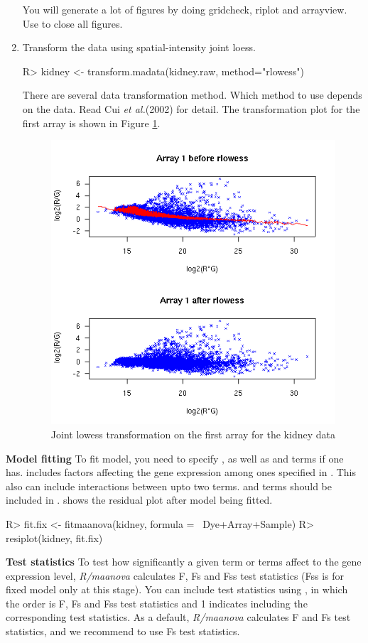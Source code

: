 \begin{enumerate}
You will generate a lot of figures by doing 
gridcheck, riplot and arrayview. Use
 to close all figures.
\item Transform the data using spatial-intensity joint loess.
\begin{Sinput}
R> kidney <- transform.madata(kidney.raw, method="rlowess")
\end{Sinput}
There are several data transformation method. Which method to use depends on
the data. Read Cui {\it et al.}(2002) for detail. The transformation
plot for the first array is shown in Figure \ref{fig:lowess}.
\begin{figure}[htbp]
\centering
\includegraphics{rlowess.png}
\caption{Joint lowess transformation on the first array for the kidney data}
\label{fig:lowess}
\end{figure}
\end{enumerate}
{\bf Model fitting} To fit model, you need to specify ,
as well as  and  terms if one
has.  includes factors affecting the gene expression among
ones specified in . This also can include interactions
between upto two terms.  and  terms
should be included in . 
 shows the residual plot after model being fitted.  
\begin{Sinput}
R> fit.fix <- fitmaanova(kidney, formula = ~Dye+Array+Sample)
R> resiplot(kidney, fit.fix)
\end{Sinput}
{\bf Test statistics} To test how significantly a given term or terms affect
to the gene expression level, {\em R/maanova} calculates F, Fs and Fss test
statistics  (Fss is for fixed model only at this stage). You can include test statistics using
, in which the order is F, Fs and Fss test statistics
and 1 indicates including the corresponding test statistics. As a default, {\em R/maanova} calculates F and Fs test statistics, and we recommend to use Fs test statistics.   

